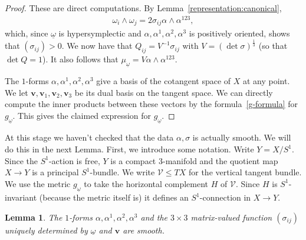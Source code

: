 \documentclass[11pt]{amsart}
\theoremstyle{plain}
\newtheorem{lemma}[theorem]{Lemma}
\theoremstyle{definition}
\theoremstyle{plain}
\theoremstyle{definition}
\numberwithin{equation}{section}
\numberwithin{theorem}{section}
\begin{document}
\begin{proof}
These are direct computations. By Lemma~\ref{representation:canonical},
   \begin{align}
        \omega_i\wedge\omega_j 
        = 
    2\sigma_{ij}\alpha\wedge\alpha^{123},
    \end{align}
    which, since $\underline{\omega}$ is hypersymplectic and $\alpha, \alpha^1,\alpha^2,\alpha^3$ is positively oriented, shows that $(\sigma_{ij}) >0$. We now have that $Q_{ij}=V^{-1}\sigma_{ij}$ with $V=\left(\det\sigma\right)^\frac{1}{3}$ (so that $\det Q = 1$). It also follows that $\mu_{\underline\omega} = V\alpha\wedge \alpha^{123}$. 
    
    The $1$-forms $\alpha,\alpha^1,\alpha^2,\alpha^3$ give a basis of the cotangent space of $X$ at any point. We let $\bm v, \bm v_1,\bm v_2,\bm v_3$ be its dual basis on the tangent space. We can directly compute the inner products between these vectors by the formula~\eqref{g-formula} for $g_{\underline{\omega}}$. This gives the claimed expression for $g_{\underline{\omega}}$.
\end{proof}

At this stage we haven't checked that the data $\alpha, \sigma$ is actually smooth. We will do this in the next Lemma. First, we introduce some notation. Write $Y = X/S^1$. Since the $S^1$-action is free, $Y$ is a compact 3-manifold and the quotient map $X \to Y$ is a principal $S^1$-bundle. We write $\mathcal{V} \leq TX$ for the vertical tangent bundle. We use the metric $g_{\underline{\omega}}$ to take the horizontal complement $H$ of $\mathcal{V}$. Since $H$ is $S^1$-invariant (because the metric itself is) it defines an $S^1$-connection in $X \to Y$. 

\begin{lemma}
    The $1$-forms $\alpha, \alpha^1,\alpha^2,\alpha^3$ and the $3\times 3$ matrix-valued function $\left(\sigma_{ij}\right)$ uniquely determined by $\underline\omega$ and $\bm v$ are smooth.  
\end{lemma}
\end{document}
